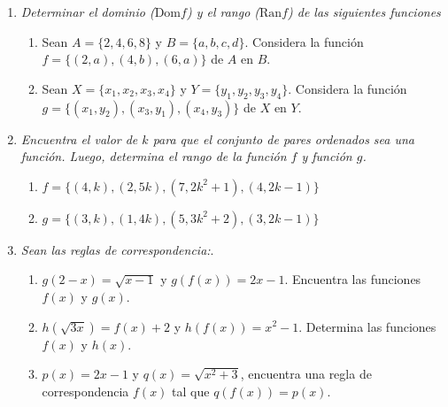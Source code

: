 \documentclass[a4paper,10pt]{article} %
\begin{document}
\begin{enumerate}

\item {\it Determinar el dominio (\(\text{Dom} f\)) y el rango (\(\text{Ran} f\)) de las siguientes funciones} %

\begin{enumerate}[label=\textbf{\alph*)}, left=0pt]
\item Sean \(A = \{2, 4, 6, 8\}\) y \(B = \{a, b, c, d\}\). Considera la función \(f = \{(2, a), (4, b), (6, a)\}\) de \(A\) en \(B\).
\item Sean \(X = \{x_1, x_2, x_3, x_4\}\) y \(Y = \{y_1, y_2, y_3, y_4\}\). Considera la función \(g = \{(x_1, y_2), (x_3, y_1), (x_4, y_3)\}\) de \(X\) en \(Y\).
\end{enumerate}


\item {\it Encuentra el valor de \(k\) para que el conjunto de pares ordenados sea una función. Luego, determina el rango de la función \(f\) y función \(g\). } %

\begin{enumerate}[label=\textbf{\alph*)}, left=0pt]
\item \(f = \{(4, k), (2, 5k), (7, 2k^2 + 1), (4, 2k - 1)\}\)
\item \(g = \{(3, k), (1, 4k), (5, 3k^2 + 2), (3, 2k - 1)\}\)
\end{enumerate}


\item {\it Sean las reglas de correspondencia:}. 

\begin{enumerate}[label=\textbf{\alph*)}, left=0pt]

\item \(g(2 - x) = \sqrt{x - 1}\) y \(g(f(x)) = 2x - 1\). Encuentra las funciones \(f(x)\) y \(g(x)\).

\item \(h(\sqrt{3x}) = f(x) + 2\) y \(h(f(x)) = x^2 - 1\). Determina las funciones \(f(x)\) y \(h(x)\).

\item \(p(x) = 2x - 1\) y \(q(x) = \sqrt{x^2 + 3}\), encuentra una regla de correspondencia \(f(x)\) tal que \(q(f(x)) = p(x)\).

\end{enumerate}








\end{enumerate}
\end{document}
